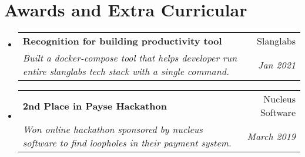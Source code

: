 \documentclass[letterpaper,11pt]{article}
\makeatletter
\newcommand{\resumeSubheading}[4]{
  \vspace{-1pt}\item
    \begin{tabular*}{0.97\textwidth}{l@{\extracolsep{\fill}}r}
      \textbf{#1} & #2 \\
      \textit{\small#3} & \textit{\small #4} \\
    \end{tabular*}\vspace{-5pt}
}
\newcommand{\resumeSubHeadingListStart}{\begin{itemize}[leftmargin=*]}
\newcommand{\resumeSubHeadingListEnd}{\end{itemize}}
\makeatother
\begin{document}
\section{Awards and Extra Curricular}
  \resumeSubHeadingListStart
    \resumeSubheading
        {Recognition for building productivity tool}{Slanglabs}
        {Built a docker-compose tool that helps developer run entire slanglabs tech stack with a single command.}{Jan 2021}
    \resumeSubheading
        {2nd Place in Payse Hackathon}{Nucleus Software}
        {Won online hackathon sponsored by nucleus software to find loopholes in their payment system.}{March 2019}
  \resumeSubHeadingListEnd
\end{document}
